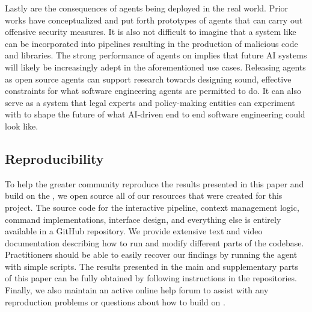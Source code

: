 Lastly are the consequences of \bench agents being deployed in the real world.
Prior works have conceptualized and put forth prototypes of agents that can carry out offensive security measures.
It is also not difficult to imagine that a system like \lumyn can be incorporated into pipelines resulting in the production of malicious code and libraries.
The strong performance of agents on \bench implies that future AI systems will likely be increasingly adept in the aforementioned use cases.
Releasing \bench agents as open source agents can support research towards designing sound, effective constraints for what software engineering agents are permitted to do.
It can also serve as a system that legal experts and policy-making entities can experiment with to shape the future of what AI-driven end to end software engineering could look like.

\subsection{Reproducibility}
\label{appx:statement:reproducibility}
To help the greater community reproduce the results presented in this paper and build on the \bench, we open source all of our resources that were created for this project.
The source code for the interactive pipeline, context management logic, command implementations, interface design, and everything else is entirely available in a GitHub repository.
We provide extensive text and video documentation describing how to run and modify different parts of the codebase.
Practitioners should be able to easily recover our findings by running the agent with simple scripts.
The results presented in the main and supplementary parts of this paper can be fully obtained by following instructions in the repositories.
Finally, we also maintain an active online help forum to assist with any reproduction problems or questions about how to build on \bench.

